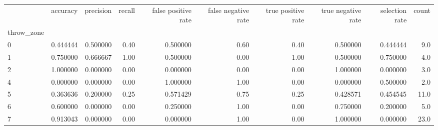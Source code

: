\begin{tabular}{lrrrrrrrrr}
\toprule
{} &  accuracy &  precision &  recall &  false positive rate &  false negative rate &  true positive rate &  true negative rate &  selection rate &  count \\
throw\_zone &           &            &         &                      &                      &                     &                     &                 &        \\
\midrule
0          &  0.444444 &   0.500000 &    0.40 &             0.500000 &                 0.60 &                0.40 &            0.500000 &        0.444444 &    9.0 \\
1          &  0.750000 &   0.666667 &    1.00 &             0.500000 &                 0.00 &                1.00 &            0.500000 &        0.750000 &    4.0 \\
2          &  1.000000 &   0.000000 &    0.00 &             0.000000 &                 0.00 &                0.00 &            1.000000 &        0.000000 &    3.0 \\
4          &  0.000000 &   0.000000 &    0.00 &             1.000000 &                 1.00 &                0.00 &            0.000000 &        0.500000 &    2.0 \\
5          &  0.363636 &   0.200000 &    0.25 &             0.571429 &                 0.75 &                0.25 &            0.428571 &        0.454545 &   11.0 \\
6          &  0.600000 &   0.000000 &    0.00 &             0.250000 &                 1.00 &                0.00 &            0.750000 &        0.200000 &    5.0 \\
7          &  0.913043 &   0.000000 &    0.00 &             0.000000 &                 1.00 &                0.00 &            1.000000 &        0.000000 &   23.0 \\
\bottomrule
\end{tabular}
